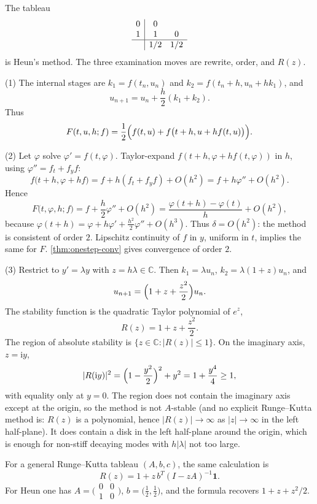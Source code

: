 \documentclass[11pt,a4paper]{article}
\begin{document}
\begin{example}
\label{ex:heun-2023}
The tableau
\[
\begin{array}{c|cc}
0 & 0 \\
1 & 1 & 0 \\
\hline
  & 1/2 & 1/2
\end{array}
\]
is Heun's method. The three examination moves are rewrite, order, and \(R(z)\).

(1) The internal stages are \(k_{1}=f(t_{n},u_{n})\) and \(k_{2}=f(t_{n}+h,u_{n}+h k_{1})\), and
\[
u_{n+1}
=
u_{n}+\frac h2(k_{1}+k_{2}).
\]
Thus
\[
F(t,u,h;f)
=
\frac12\Bigl(f(t,u)+f\bigl(t+h,u+hf(t,u)\bigr)\Bigr).
\]

(2) Let \(\varphi\) solve \(\varphi'=f(t,\varphi)\). Taylor-expand \(f(t+h,\varphi+hf(t,\varphi))\) in \(h\), using \(\varphi''=f_{t}+f_{y}f\):
\[
f\bigl(t+h,\varphi+hf\bigr)
=
f+h(f_{t}+f_{y}f)+O(h^{2})
=
f+h\varphi''+O(h^{2}).
\]
Hence
\[
F\bigl(t,\varphi,h;f\bigr)
=
f+\frac h2\varphi''+O(h^{2})
=
\frac{\varphi(t+h)-\varphi(t)}{h}+O(h^{2}),
\]
because \(\varphi(t+h)=\varphi+h\varphi'+\frac{h^{2}}{2}\varphi''+O(h^{3})\). Thus \(\delta=O(h^{2})\): the method is consistent of order \(2\). Lipschitz continuity of \(f\) in \(y\), uniform in \(t\), implies the same for \(F\). \cref{thm:onestep-conv} gives convergence of order \(2\).

(3) Restrict to \(y'=\lambda y\) with \(z=h\lambda\in\mathbb C\). Then \(k_{1}=\lambda u_{n}\), \(k_{2}=\lambda(1+z)u_{n}\), and
\[
u_{n+1}
=
\Bigl(1+z+\frac{z^{2}}{2}\Bigr)u_{n}.
\]
The stability function is the quadratic Taylor polynomial of \(e^{z}\),
\[
R(z)=1+z+\frac{z^{2}}{2}.
\]
The region of absolute stability is \(\{z\in\mathbb C:\lvert R(z)\rvert\le 1\}\). On the imaginary axis, \(z=\mathrm{i}y\),
\[
\lvert R(\mathrm{i}y)\rvert^{2}
=
\Bigl(1-\frac{y^{2}}{2}\Bigr)^{2}+y^{2}
=
1+\frac{y^{4}}{4}
\ge 1,
\]
with equality only at \(y=0\). The region does not contain the imaginary axis except at the origin, so the method is not \(A\)-stable (and no explicit Runge--Kutta method is: \(R(z)\) is a polynomial, hence \(\lvert R(z)\rvert\to\infty\) as \(\lvert z\rvert\to\infty\) in the left half-plane). It does contain a disk in the left half-plane around the origin, which is enough for non-stiff decaying modes with \(h\lvert\lambda\rvert\) not too large.

For a general Runge--Kutta tableau \((A,b,c)\), the same calculation is
\[
R(z)
=
1+z\,b^{T}(I-zA)^{-1}\mathbf{1}.
\]
For Heun one has \(A=\bigl(\begin{smallmatrix}0&0\\1&0\end{smallmatrix}\bigr)\), \(b=\bigl(\tfrac12,\tfrac12\bigr)\), and the formula recovers \(1+z+z^{2}/2\).
\end{example}
\end{document}
